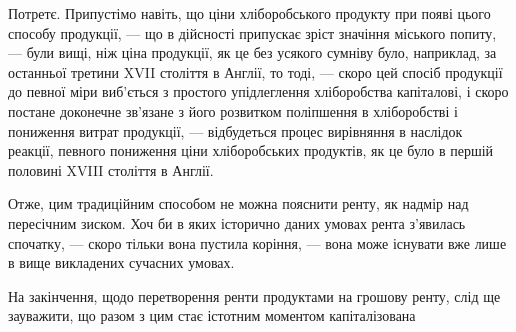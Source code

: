 Потретє. Припустімо навіть, що ціни хліборобського продукту при
появі цього способу продукції, — що в дійсності припускає зріст значіння міського
попиту, — були вищі, ніж ціна продукції, як це без усякого сумніву було,
наприклад, за останньої третини XVII століття в Англії, то тоді, — скоро цей
спосіб продукції до певної міри виб’ється з простого упідлеглення хліборобства
капіталові, і скоро постане доконечне зв’язане з його розвитком поліпшення
в хліборобстві і пониження витрат продукції, — відбудеться процес вирівняння
в наслідок реакції, певного пониження ціни хліборобських продуктів, як це
було в першій половині XVIII століття в Англії.

Отже, цим традиційним способом не можна пояснити ренту, як надмір
над пересічним зиском. Хоч би в яких історично даних умовах рента з’явилась
спочатку, — скоро тільки вона пустила коріння, — вона може існувати вже
лише в вище викладених сучасних умовах.

На закінчення, щодо перетворення ренти продуктами на грошову ренту,
слід ще зауважити, що разом з цим стає істотним моментом капіталізована
\parbreak{}  %
